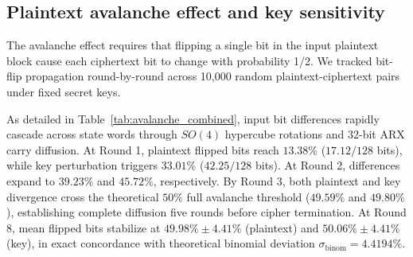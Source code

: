 \documentclass[review,12pt]{elsarticle}
\begin{document}
\subsection{Plaintext avalanche effect and key sensitivity}
\label{subsec:avalanche_sensitivity}
The avalanche effect requires that flipping a single bit in the input plaintext block cause each ciphertext bit to change with probability 1/2. We tracked bit-flip propagation round-by-round across 10,000 random plaintext-ciphertext pairs under fixed secret keys.

\begin{table}[htbp]
\caption{Plaintext avalanche effect and key sensitivity propagation across rounds 1 to 8 (10,000 executions)}
\label{tab:avalanche_combined}
\centering
\small
{}
\end{table}

As detailed in Table~\ref{tab:avalanche_combined}, input bit differences rapidly cascade across state words through $SO(4)$ hypercube rotations and 32-bit ARX carry diffusion. At Round 1, plaintext flipped bits reach $13.38\%$ ($17.12 / 128$ bits), while key perturbation triggers $33.01\%$ ($42.25 / 128$ bits). At Round 2, differences expand to $39.23\%$ and $45.72\%$, respectively. By Round 3, both plaintext and key divergence cross the theoretical $50\%$ full avalanche threshold ($49.59\%$ and $49.80\%$), establishing complete diffusion five rounds before cipher termination. At Round 8, mean flipped bits stabilize at $49.98\% \pm 4.41\%$ (plaintext) and $50.06\% \pm 4.41\%$ (key), in exact concordance with theoretical binomial deviation $\sigma_{\text{binom}} = 4.4194\%$.
\end{document}
